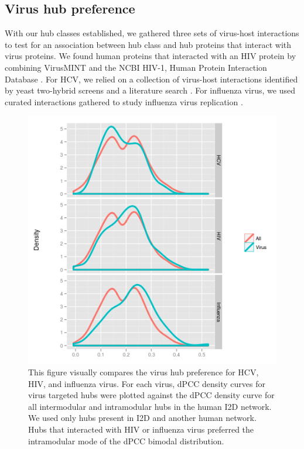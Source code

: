 \subsection{Virus hub preference}

With our hub classes established, we gathered three sets of virus-host
interactions to test for an association between hub class and hub
proteins that interact with virus proteins. We found human proteins
that interacted with an HIV protein by combining VirusMINT
\cite{chatr08} and the NCBI HIV-1, Human Protein Interaction Database
\cite{fu09}. For HCV, we relied on a collection of virus-host
interactions identified by yeast two-hybrid screens and a literature
search \cite{dechassey08}. For influenza virus, we used curated
interactions gathered to study influenza virus replication
\cite{konig2009human}.



\begin{figure}
\begin{center}
\includegraphics[scale=0.5]{figs/sysBio_2_new}
\end{center}
\caption[Virus hub preference]{\small This figure visually compares
  the virus hub preference for HCV, HIV, and influenza virus. For each
  virus, dPCC density curves for virus targeted hubs were plotted
  against the dPCC density curve for all intermodular and intramodular
  hubs in the human I2D network. We used only hubs present in I2D and
  another human network. Hubs that interacted with HIV or influenza
  virus preferred the intramodular mode of the dPCC bimodal
  distribution. \label{fig:sysBio:fig2}}
\end{figure}


